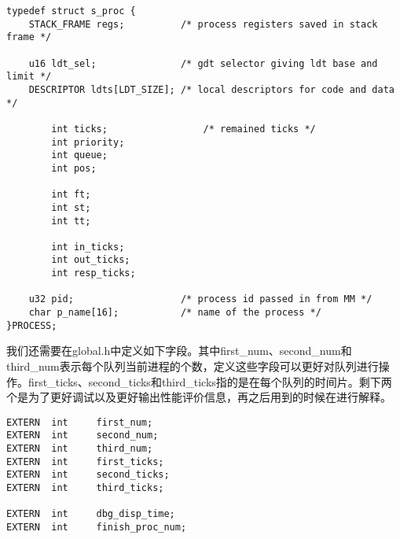 \documentclass{whureport}
\begin{document}
\begin{lstlisting}
typedef struct s_proc {
	STACK_FRAME regs;          /* process registers saved in stack frame */

	u16 ldt_sel;               /* gdt selector giving ldt base and limit */
	DESCRIPTOR ldts[LDT_SIZE]; /* local descriptors for code and data */

        int ticks;                 /* remained ticks */
        int priority;
		int queue;
		int pos;

		int ft;
		int st;
		int tt;

        int in_ticks;
        int out_ticks;
        int resp_ticks;

	u32 pid;                   /* process id passed in from MM */
	char p_name[16];           /* name of the process */
}PROCESS;
\end{lstlisting}

我们还需要在global.h中定义如下字段。其中first\_num、second\_num和third\_num表示每个队列当前进程的个数，定义这些字段可以更好对队列进行操作。first\_ticks、second\_ticks和third\_ticks指的是在每个队列的时间片。剩下两个是为了更好调试以及更好输出性能评价信息，再之后用到的时候在进行解释。

\begin{lstlisting}
EXTERN  int     first_num;
EXTERN  int     second_num;
EXTERN  int     third_num;
EXTERN  int     first_ticks;
EXTERN  int     second_ticks;
EXTERN  int     third_ticks;

EXTERN  int     dbg_disp_time;
EXTERN  int     finish_proc_num;
\end{lstlisting}
\end{document}
